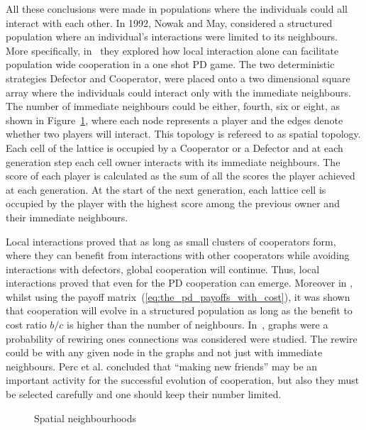 \documentclass{article}
\theoremstyle{definition}
\begin{document}
All these conclusions were made in populations where the individuals could all
interact with each other. In 1992, Nowak and May, considered a structured population
where an individual's interactions were limited to its neighbours.
More specifically, in~\cite{Nowak1992b} they explored how local interaction
alone can facilitate population wide cooperation in a one shot PD game. The two
deterministic strategies Defector and Cooperator, were placed onto a two
dimensional square array where the individuals could interact only with the
immediate neighbours. The number of immediate neighbours could be either,
fourth, six or eight, as shown in Figure~\ref{fig:topologies}, where each node
represents a player and the edges denote whether two players will interact. This
topology is refereed to as spatial topology. Each cell of the lattice is
occupied by a Cooperator or a Defector and at each generation step each cell owner
interacts with its immediate neighbours. The score of each player is calculated
as the sum of all the scores the player achieved at each generation. At the
start of the next generation, each lattice cell is occupied by the player with
the highest score among the previous owner and their immediate neighbours.

Local interactions proved that as long as small clusters of cooperators form, where
they can benefit from interactions with other cooperators while avoiding
interactions with defectors, global cooperation will continue. Thus, local
interactions proved that even for the PD cooperation can emerge. Moreover in
\cite{Ohtsuki2006}, whilst using the payoff
matrix~(\ref{eq:the_pd_payoffs_with_cost}), it was shown that cooperation will
evolve in a structured population as long as the benefit to cost ratio \(b / c\)
is higher than the number of neighbours. In~\cite{Perc2011}, graphs were a probability
of rewiring ones connections was considered were studied. The rewire could be with any
given node in the graphs and not just with immediate neighbours. Perc et al.
concluded that ``making new friends'' may be an important activity for the
successful evolution of cooperation, but also they must be selected
carefully and one should keep their number limited.

\begin{figure}[!hbtp]
\centering
    \begin{subfigure}{.25\textwidth}
        
    \end{subfigure}
    \begin{subfigure}{.25\textwidth}\centering
        
     \end{subfigure}
     \begin{subfigure}{.25\textwidth}\centering
        
     \end{subfigure}
     \caption{Spatial neighbourhoods}\label{fig:topologies}
    \end{figure}
\end{document}
